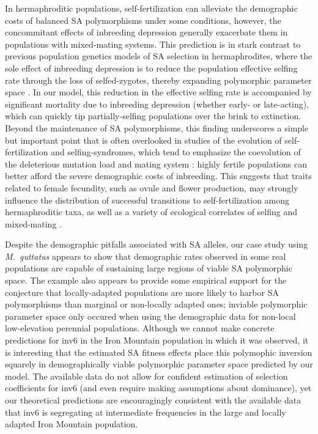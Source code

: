 \documentclass[11pt]{article}
\begin{document}
In hermaphroditic populations, self-fertilization can alleviate the demographic costs of balanced SA polymorphisms under some conditions, however, the concommitant effects of inbreeding depression generally exacerbate them in populations with mixed-mating systems. This prediction is in stark contrast to previous population genetics models of SA selection in hermaphrodites, where the sole effect of inbreeding depression is to reduce the population effective selfing rate through the loss of selfed-zygotes, thereby expanding polymorphic parameter space \citep{JordanConnallon2014, Olito2017}. In our model, this reduction in the effective selfing rate is accompanied by significant mortality due to inbreeding depression (whether early- or late-acting), which can quickly tip partially-selfing populations over the brink to extinction. Beyond the maintenance of SA polymorphisms, this finding underscores a simple but important point that is often overlooked in studies of the evolution of self-fertilization and selfing-syndromes, which tend to emphasize the coevolution of the deleterious mutation load and mating system \citep[e.g.,][]{Charlesworth1987, LandeSchemske1985, Goodwillie2005}: highly fertile populations can better afford the severe demographic costs of inbreeding. This suggests that traits related to female fecundity, such as ovule and flower production, may strongly influence the distribution of successful transitions to self-fertilization among hermaphroditic taxa, as well as a variety of ecological correlates of selfing and mixed-mating \citep{Goodwillie2005, Igic2006, Grossenbacher2015}.

Despite the demographic pitfalls associated with SA alleles, our case study using {\itshape M.~guttatus} appears to show that demographic rates observed in some real populations are capable of sustaining large regions of viable SA polymorphic space. The example also appears to provide some empirical support for the conjecture that locally-adapted populations are more likely to harbor SA polymorphisms than marginal or non-locally adapted ones; inviable polymorphic parameter space only occured when using the demographic data for non-local low-elevation perennial populations. Although we cannot make concrete predictions for inv6 in the Iron Mountain population in which it was observed, it is interesting that the estimated SA fitness effects place this polymophic inversion squarely in demographically viable polymorphic parameter space predicted by our model. The available data do not allow for confident estimation of selection coefficients for inv6 (and even require making assumptions about dominance), yet our theoretical predictions are encouragingly consistent with the available data that inv6 is segregating at intermediate frequencies in the large and locally adapted Iron Mountain population. 
\end{document}
